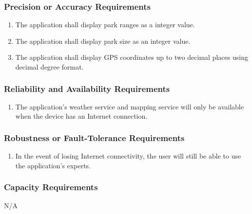 \documentclass[titlepage]{article}
\newcounter{myCounter}
\begin{document}
\subsubsection{Precision or Accuracy Requirements}
\label{ssub:precision_or_accuracy_requirements}
\begin{enumerate}[{PR}1. ]
    \setcounter{enumi}{\themyCounter}
	\item The application shall display park ranges as a integer value. 
	\item The application shall display park size as an integer value. 
    \item The application shall display GPS coordinates up to two decimal places using decimal
    degree format. 
	\setcounter{myCounter}{\theenumi}
\end{enumerate}

\subsubsection{Reliability and Availability Requirements}
\label{ssub:reliability_and_availability_requirements}
\begin{enumerate}[{PR}1. ]
    \setcounter{enumi}{\themyCounter}
    \item The application's weather service and mapping service will only be available when the
    device has an Internet connection.
    \setcounter{myCounter}{\theenumi}
\end{enumerate}

\subsubsection{Robustness or Fault-Tolerance Requirements}
\label{ssub:robustness_or_fault_tolerance_requirements}
\begin{enumerate}[{PR}1. ]
    \setcounter{enumi}{\themyCounter}
	\item In the event of losing Internet connectivity, the user will still be able to use the application's experts. 
    \setcounter{myCounter}{\theenumi}
\end{enumerate}

\subsubsection{Capacity Requirements}
\label{ssub:capacity_requirements}
N/A
\end{document}
